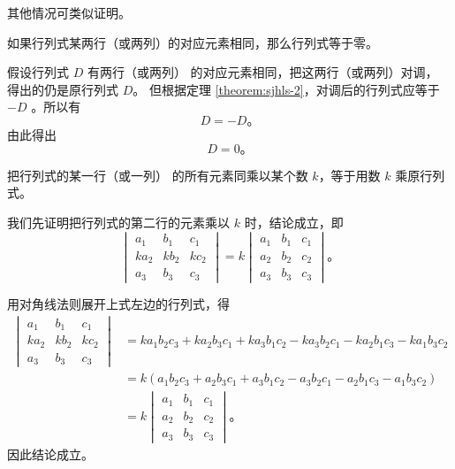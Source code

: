 其他情况可类似证明。

\begin{corollary} \label{corollary:sjhls-2-1}
    如果行列式某两行（或两列）的对应元素相同，那么行列式等于零。
\end{corollary}

\zhengming 假设行列式 $D$ 有两行（或两列） 的对应元素相同，把这两行（或两列）对调， 得出的仍是原行列式 $D$。
但根据定理 \ref{theorem:sjhls-2}，对调后的行列式应等于 $-D$ 。所以有
$$ D = -D \text{。} $$
由此得出
$$ D = 0 \text{。} $$



\begin{theorem} \label{theorem:sjhls-3}
    把行列式的某一行（或一列） 的所有元素同乘以某个数 $k$，等于用数 $k$ 乘原行列式。
\end{theorem}

\zhengming 我们先证明把行列式的第二行的元素乘以 $k$ 时，结论成立，即
$$
\begin{vmatrix*}
    a_1 & b_1 & c_1 \\
    ka_2 & kb_2 & kc_2 \\
    a_3 & b_3 & c_3
\end{vmatrix*}
=
k \begin{vmatrix*}
    a_1 & b_1 & c_1 \\
    a_2 & b_2 & c_2 \\
    a_3 & b_3 & c_3
\end{vmatrix*} \text{。}
$$

用对角线法则展开上式左边的行列式，得
\begin{align*}
    \begin{vmatrix*}
        a_1 & b_1 & c_1 \\
        ka_2 & kb_2 & kc_2 \\
        a_3 & b_3 & c_3
    \end{vmatrix*}
        &= ka_1b_2c_3 + ka_2b_3c_1 + ka_3b_1c_2 - ka_3b_2c_1 - ka_2b_1c_3 - ka_1b_3c_2 \\
        &= k(a_1b_2c_3 + a_2b_3c_1 + a_3b_1c_2 - a_3b_2c_1 - a_2b_1c_3 - a_1b_3c_2) \\
        &= k \begin{vmatrix*}
                a_1 & b_1 & c_1 \\
                a_2 & b_2 & c_2 \\
                a_3 & b_3 & c_3
            \end{vmatrix*} \text{。}
\end{align*}
因此结论成立。

